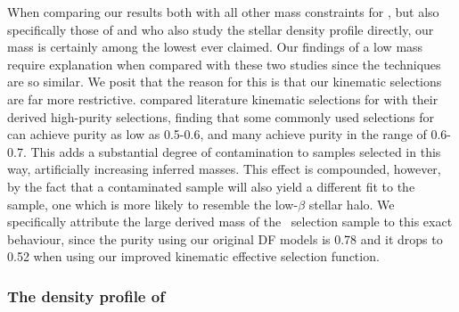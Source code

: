 When comparing our results both with all other mass constraints for \gse, but also specifically those of \textcite{han22} and \textcite{mackereth20} who also study the \gse stellar density profile directly, our mass is certainly among the lowest ever claimed. Our findings of a low mass require explanation when compared with these two studies since the techniques are so similar. We posit that the reason for this is that our kinematic selections are far more restrictive. \cite{lane22} compared literature kinematic selections for \gse with their derived high-purity selections, finding that some commonly used selections for \gse can achieve purity as low as 0.5-0.6, and many achieve purity in the range of 0.6-0.7. This adds a substantial degree of contamination to samples selected in this way, artificially increasing inferred masses. This effect is compounded, however, by the fact that a contaminated sample will also yield a different fit to the \gse sample, one which is more likely to resemble the low-$\beta$ stellar halo.  We specifically attribute the large derived mass of the \JRLz\ selection sample to this exact behaviour, since the purity using our original DF models is 0.78 and it drops to 0.52 when using our improved kinematic effective selection function.

\subsubsection{The density profile of \gse}

